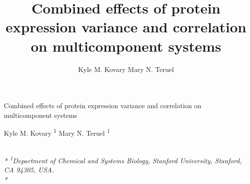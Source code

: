 \documentclass[11pt,twocolumn]{article}
\title{Combined effects of protein expression variance and correlation on
multicomponent systems}
\author{
Kyle M. Kovary
Mary N. Teruel
}
\date{}
\begin{document}
\begin{singlespace}
\begin{center}
\huge Combined effects of protein expression variance and correlation on
multicomponent systems
\end{center}
\begin{center}
\large
Kyle M. Kovary \textsuperscript{1} 
Mary N. Teruel \textsuperscript{1} 
\end{center}
\begin{justify}
\footnotesize \emph{ 
\\*
\textsuperscript{1}Department of Chemical and Systems Biology, Stanford University,
Stanford, CA 94305, USA.\\*
}
\setcounter{num}{1}
\\[0.1cm]
\footnotesize \emph{ 
}
\end{justify}
\normalsize


\end{singlespace}
\end{document}

